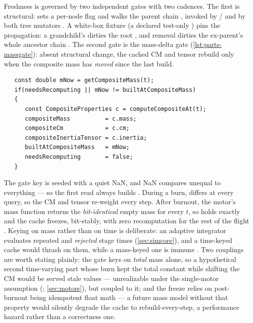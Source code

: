 Freshness is governed by two independent gates with two cadences. The first is structural:
 sets a per-node flag and walks the parent chain
, invoked by /
 and by both tree mutators . A
white-box fixture (a declared test-only  ) pins the
propagation: a grandchild's  dirties the root
, and removal dirties the ex-parent's whole ancestor chain
. The second gate is the mass-delta gate
(\cref{lst:parts-massgate}): absent structural change, the cached CM and tensor rebuild only
when the composite mass has \emph{moved} since the last build.

\begin{listing}[htbp]
\begin{verbatim}
   const double mNow = getCompositeMass(t);
   if(needsRecomputing || mNow != builtAtCompositeMass)
   {
      const CompositeProperties c = computeCompositeAt(t);
      compositeMass          = c.mass;
      compositeCm            = c.cm;
      compositeInertiaTensor = c.inertia;
      builtAtCompositeMass   = mNow;
      needsRecomputing       = false;
   }
\end{verbatim}
\caption{The mass-delta gate in 
: a structural edit always rebuilds; otherwise the walk
re-runs exactly when the composite mass differs --- by exact floating-point \code{!=} ---
from the mass it was last built at.}\label{lst:parts-massgate}
\end{listing}

\begin{keyinsight}[Why exact \code{==} on a double is the right gate]
The gate key  is seeded with a quiet NaN, and NaN compares unequal
to everything --- so the first read always builds . During a
burn,  differs at every query, so the CM and tensor re-weight every step.
After burnout, the motor's mass function returns the \emph{bit-identical} empty mass for every
$t$, so  holds exactly and the cache freezes, bit-stably,
with zero recomputation for the rest of the flight . Keying on
mass rather than on time is deliberate: an adaptive integrator evaluates repeated and
\emph{rejected} stage times (\cref{sec:simcore}), and a time-keyed cache would thrash on them,
while a mass-keyed one is immune . Two couplings are worth
stating plainly: the gate keys on \emph{total} mass alone, so a hypothetical second
time-varying part whose burn kept the total constant while shifting the CM would be served
stale values --- unrealizable under the single-motor assumption
(; \cref{sec:motors}), but coupled to it; and the freeze
relies on post-burnout  being idempotent float math --- a future mass model
without that property would silently degrade the cache to rebuild-every-step, a performance
hazard rather than a correctness one.
\end{keyinsight}

